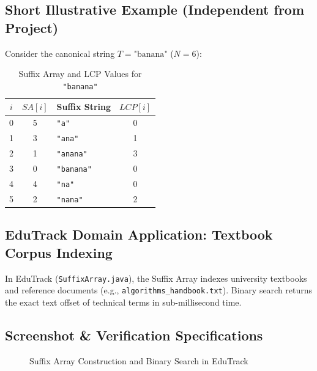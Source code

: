\subsection{Short Illustrative Example (Independent from Project)}
Consider the canonical string $T = \text{"banana"}$ ($N = 6$):
\begin{table}[H]
\centering
\begin{tabular}{cclc}
\toprule
$i$ & $SA[i]$ & Suffix String & $LCP[i]$ \\
\midrule
0 & 5 & \texttt{"a"} & 0 \\
1 & 3 & \texttt{"ana"} & 1 \\
2 & 1 & \texttt{"anana"} & 3 \\
3 & 0 & \texttt{"banana"} & 0 \\
4 & 4 & \texttt{"na"} & 0 \\
5 & 2 & \texttt{"nana"} & 2 \\
\bottomrule
\end{tabular}
\caption{Suffix Array and LCP Values for \texttt{"banana"}}
\label{tab:banana_sa}
\end{table}

\subsection{EduTrack Domain Application: Textbook Corpus Indexing}
In EduTrack (\texttt{SuffixArray.java}), the Suffix Array indexes university textbooks and reference documents (e.g., \texttt{algorithms\_handbook.txt}). Binary search returns the exact text offset of technical terms in sub-millisecond time.

\subsection{Screenshot \& Verification Specifications}
\begin{figure}[H]
    \centering
    \caption{Suffix Array Construction and Binary Search in EduTrack}
    \label{fig:screenshot_sa}
\end{figure}

